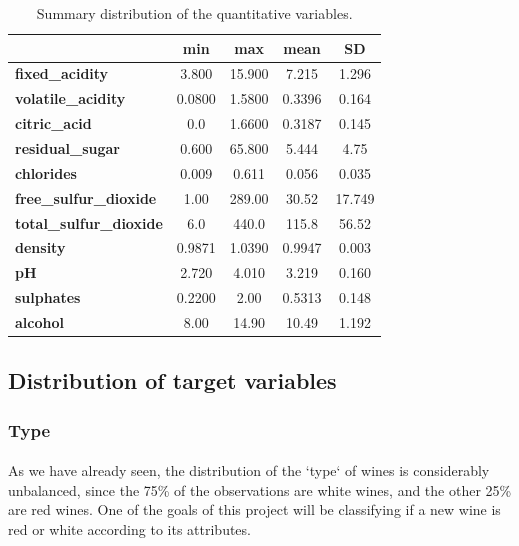 \documentclass[10pt]{article}
\begin{document}
\begin{table}[h]
	\centering
	\begin{tabular}{|l|c|c|c|c|}
		\hline
		& \textbf{min} & \textbf{max} & \textbf{mean} & \textbf{SD} \\ \hline
		\textbf{fixed\_acidity} & 3.800 & 15.900 & 7.215 & 1.296 \\ \hline
		\textbf{volatile\_acidity} & 0.0800 & 1.5800 & 0.3396 & 0.164 \\ \hline
		\textbf{citric\_acid} & 0.0 & 1.6600 & 0.3187 & 0.145 \\ \hline
		\textbf{residual\_sugar} & 0.600 & 65.800 & 5.444 & 4.75 \\ \hline
		\textbf{chlorides} & 0.009 & 0.611 & 0.056 & 0.035 \\ \hline
		\textbf{free\_sulfur\_dioxide} & 1.00 & 289.00 & 30.52 & 17.749 \\ \hline
		\textbf{total\_sulfur\_dioxide} & 6.0 & 440.0 & 115.8 & 56.52 \\ \hline
		\textbf{density} & 0.9871 & 1.0390 & 0.9947 & 0.003	 \\ \hline
		\textbf{pH} & 2.720 & 4.010 & 3.219 & 0.160 \\ \hline
		\textbf{sulphates} & 0.2200 & 2.00 & 0.5313 & 0.148 \\ \hline
		\textbf{alcohol} & 8.00 & 14.90 & 10.49 & 1.192 \\ \hline
	\end{tabular}%
	\caption{Summary distribution of the quantitative variables.}
	\label{table:variables}
\end{table}

\subsection{Distribution of target variables}
\subsubsection{Type}

\paragraph*{}
As we have already seen, the distribution of the `type` of wines is considerably unbalanced, since the 75\% of the observations are white wines, and the other 25\% are red wines. One of the goals of this project will be classifying if a new wine is red or white according to its attributes.
\end{document}
